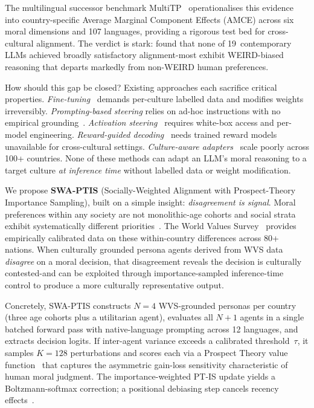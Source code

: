 \documentclass{article}
\begin{document}
The multilingual successor benchmark MultiTP~\citep{jin2025multitp} operationalises
this evidence into country-specific Average Marginal Component Effects (AMCE)
across six moral dimensions and 107 languages, providing a rigorous test bed for
cross-cultural alignment. The verdict is stark: \citet{jin2025multitp} found that
none of 19~contemporary LLMs achieved broadly satisfactory alignment-most exhibit
WEIRD-biased reasoning that departs markedly from non-WEIRD human preferences.

How should this gap be closed? Existing approaches each sacrifice critical properties.
\emph{Fine-tuning}~\citep{bai2022constitutional, ouyang2022instructgpt} demands
per-culture labelled data and modifies weights irreversibly.
\emph{Prompting-based steering} relies on ad-hoc instructions with no empirical
grounding~\citep{jin2025multitp}.
\emph{Activation steering}~\citep{arditi2025refusal, zou2023representation} requires
white-box access and per-model engineering.
\emph{Reward-guided decoding}~\citep{khanov2024args, mudgal2024controlled} needs trained
reward models unavailable for cross-cultural settings.
\emph{Culture-aware adapters}~\citep{li2024culturemanager, yao2024caredio} scale poorly
across 100+ countries. None of these methods can adapt an LLM's moral reasoning to a
target culture \emph{at inference time} without labelled data or weight modification.

We propose \textbf{SWA-PTIS} (Socially-Weighted Alignment with Prospect-Theory
Importance Sampling), built on a simple insight: \emph{disagreement is signal}.
Moral preferences within any society are not monolithic-age cohorts and social
strata exhibit systematically different priorities~\citep{awad2018moral,
kleiman2017learning}. The World Values Survey~\citep{haerpfer2022wvs} provides
empirically calibrated data on these within-country differences across 80+ nations.
When culturally grounded persona agents derived from WVS data \emph{disagree} on a
moral decision, that disagreement reveals the decision is culturally contested-and
can be exploited through importance-sampled inference-time control to
produce a more culturally representative output.

Concretely, SWA-PTIS constructs $N=4$ WVS-grounded personas per country (three
age cohorts plus a utilitarian agent), evaluates all $N+1$ agents in a single batched
forward pass with native-language prompting across 12 languages, and extracts
decision logits. If inter-agent variance exceeds a calibrated threshold~$\tau$, it
samples $K=128$ perturbations and scores each via a Prospect Theory value
function~\citep{kahneman1979prospect} that captures the asymmetric gain-loss
sensitivity characteristic of human moral judgment. The importance-weighted PT-IS
update yields a Boltzmann-softmax correction; a positional debiasing step cancels recency
effects~\citep{liu2024lost}.
\end{document}
